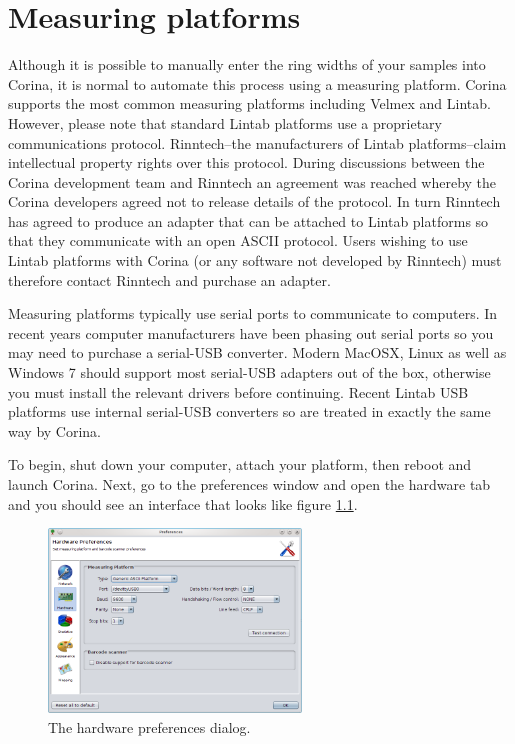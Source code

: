\chapter{Measuring platforms}
\label{txt:MeasuringPlatformConfig}

Although it is possible to manually enter the ring widths of your samples into Corina, it is normal to automate this process using a measuring platform. Corina supports the most common measuring platforms including Velmex and Lintab.  However, please note that standard Lintab platforms use a proprietary communications protocol. Rinntech--the manufacturers of Lintab platforms--claim intellectual property rights over this protocol. During discussions between the Corina development team and Rinntech an agreement was reached whereby the Corina developers agreed not to release details of the protocol. In turn Rinntech has agreed to produce an adapter that can be attached to Lintab platforms so that they communicate with an open ASCII protocol. Users wishing to use Lintab platforms with Corina (or any software not developed by Rinntech) must therefore contact Rinntech and purchase an adapter.

Measuring platforms typically use serial ports to communicate to computers. In recent years computer manufacturers have been phasing out serial ports so you may need to purchase a serial-USB converter. Modern MacOSX, Linux as well as Windows 7 should support most serial-USB adapters out of the box, otherwise you must install the relevant drivers before continuing.  Recent Lintab USB platforms use internal serial-USB converters so are treated in exactly the same way by Corina.

To begin, shut down your computer, attach your platform, then reboot and launch Corina. Next, go to the preferences window and open the hardware tab and you should see an interface that looks like figure \ref{fig:hardwareprefs}.

\begin{figure}[hbtp]
  \centering
    \includegraphics[width=0.6\textwidth]{Images/hardwareprefs.png}
    \caption{The hardware preferences dialog.}
    \label{fig:hardwareprefs}
\end{figure}

